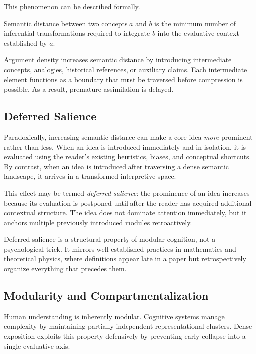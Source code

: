 This phenomenon can be described formally.

\begin{definition}
Semantic distance between two concepts $a$ and $b$ is the minimum number of inferential transformations required to integrate $b$ into the evaluative context established by $a$.
\end{definition}

Argument density increases semantic distance by introducing intermediate concepts, analogies, historical references, or auxiliary claims. Each intermediate element functions as a boundary that must be traversed before compression is possible. As a result, premature assimilation is delayed.

\subsection{Deferred Salience}

Paradoxically, increasing semantic distance can make a core idea \emph{more} prominent rather than less. When an idea is introduced immediately and in isolation, it is evaluated using the reader’s existing heuristics, biases, and conceptual shortcuts. By contrast, when an idea is introduced after traversing a dense semantic landscape, it arrives in a transformed interpretive space.

This effect may be termed \emph{deferred salience}: the prominence of an idea increases because its evaluation is postponed until after the reader has acquired additional contextual structure. The idea does not dominate attention immediately, but it anchors multiple previously introduced modules retroactively.

Deferred salience is a structural property of modular cognition, not a psychological trick. It mirrors well-established practices in mathematics and theoretical physics, where definitions appear late in a paper but retrospectively organize everything that precedes them.

\subsection{Modularity and Compartmentalization}

Human understanding is inherently modular. Cognitive systems manage complexity by maintaining partially independent representational clusters. Dense exposition exploits this property defensively by preventing early collapse into a single evaluative axis.

